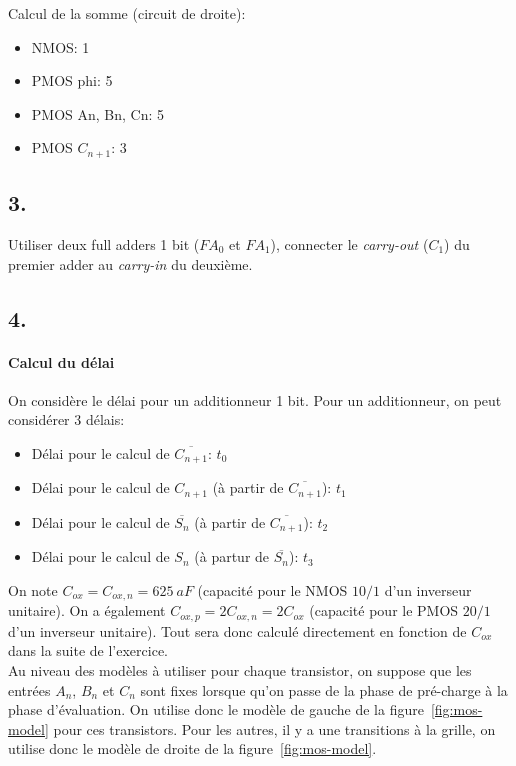 \documentclass[frenchb,DIV=14]{scrartcl}
\begin{document}
Calcul de la somme (circuit de droite):
\begin{itemize}
    \item NMOS: 1
    \item PMOS phi: 5
    \item PMOS An, Bn, Cn: 5
    \item PMOS $C_{n+1}$: 3
\end{itemize}

\subsection*{3.}

Utiliser deux full adders 1 bit ($FA_0$ et $FA_1$), connecter le 
\emph{carry-out} ($C_1$) du premier adder au \emph{carry-in} du deuxième. 

\subsection*{4.}

\paragraph{Calcul du délai}

On considère le délai pour un additionneur 1 bit.
Pour un additionneur, on peut considérer 3 délais:
\begin{itemize}
    \item Délai pour le calcul de $\overline{C_{n+1}}$: $t_0$
    \item Délai pour le calcul de $C_{n+1}$ (à partir de $\overline{C_{n+1}}$): $t_1$
    \item Délai pour le calcul de $\overline{S_n}$ (à partir de $\overline{C_{n+1}}$): $t_2$
    \item Délai pour le calcul de $S_n$ (à partur de $\overline{S_n}$): $t_3$
\end{itemize}

On note $C_{ox} = C_{ox,n} = \SI{625}{aF}$ (capacité pour le NMOS $10/1$ 
d'un inverseur unitaire). On a également $C_{ox,p} = 2C_{ox,n} = 2C_{ox}$ (capacité
pour le PMOS $20/1$ d'un inverseur unitaire). Tout sera
donc calculé directement en fonction de $C_{ox}$ dans la suite de l'exercice.\\

Au niveau des modèles à utiliser pour chaque transistor, on suppose que les
entrées $A_n$, $B_n$ et $C_n$ sont fixes lorsque qu'on passe de la phase de
pré-charge à la phase d'évaluation. On utilise donc le modèle de gauche de la
figure~\ref{fig:mos-model} pour ces transistors. Pour les autres, il y a une
transitions à la grille, on utilise donc le modèle de droite de la figure~\ref{fig:mos-model}. 
\end{document}
